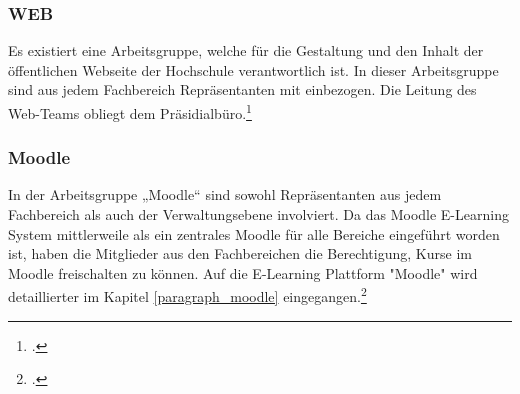 \subsubsection{WEB}
Es existiert eine Arbeitsgruppe, welche für die Gestaltung und den Inhalt der öffentlichen Webseite der Hochschule verantwortlich ist. In dieser Arbeitsgruppe sind aus jedem Fachbereich Repräsentanten mit einbezogen. Die Leitung des Web-Teams obliegt dem Präsidialbüro.\footcite[Vgl.][]{hsel_prasidialburo_2013}

\subsubsection{Moodle}
In der Arbeitsgruppe „Moodle“ sind sowohl Repräsentanten aus jedem Fachbereich als auch der Verwaltungsebene involviert. Da das Moodle E-Learning System mittlerweile als ein zentrales Moodle für alle Bereiche eingeführt worden ist, haben die Mitglieder aus den Fachbereichen die Berechtigung, Kurse im Moodle freischalten zu können. Auf die E-Learning Plattform "Moodle" wird detaillierter im Kapitel \ref{paragraph_moodle} eingegangen.\footcite[Vgl.][]{gunter_muller_interview}